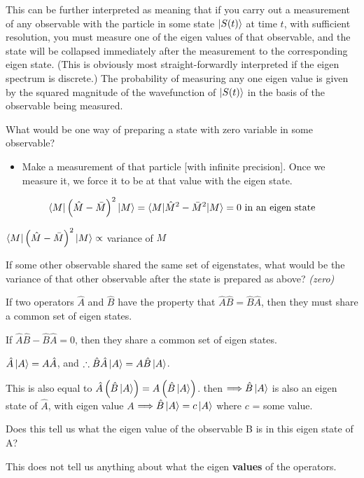 \documentclass{article}
\begin{document}
This can be further interpreted as meaning that if you carry out a measurement of any observable with the particle in some state $\ket{S(t)}$ at time $t$, with sufficient resolution, you must measure one of the eigen values of that observable, and the state will be collapsed immediately after the measurement to the corresponding eigen state.  (This is obviously most straight-forwardly interpreted if the eigen spectrum is discrete.)  The probability of measuring any one eigen value is given by the squared magnitude of the wavefunction of $\ket{S(t)}$ in the basis of the observable being measured.

What would be one way of preparing a state with zero variable in some observable?

\begin{itemize}
    \item Make a measurement of that particle [with infinite precision]. Once we measure it, we force it to be at that value with the eigen state. 
\end{itemize}

$$\braket{M|\left( \hat{M} - \bar{M} \right)^2|M} = \braket{M| \hat{M}^2 - \bar{M}^2 | M} = 0 \text{ in an eigen state}$$

$\braket{M|\left( \hat{M} -\bar{M} \right)^2|M} \propto $ variance of $M$

If some other observable shared the same set of eigenstates, what would be the variance of that other observable after the state is prepared as above? \textit{(zero)}

If two operators $\hat{A}$ and $\hat{B}$ have the property that $\hat{A} \hat{B} = \hat{B} \hat{A}$, then they must share a common set of eigen states. 

If $\hat{A} \hat{B} - \hat{B} \hat{A} = 0$, then they share a common set of eigen states. 

$\hat{A} \ket{A} = A \hat{A}$, and $\therefore \hat{B} \hat{A} \ket{A} = A \hat{B} \ket{A}$. 

This is also equal to $\hat{A} \left( \hat{B} \ket{A} \right) = A \left( \hat{B} \ket{A} \right)$. then $\Longrightarrow \hat{B} \ket{A}$ is also an eigen state of $\hat{A}$, with eigen value $A$ $\Longrightarrow \hat{B} \ket{A} = c \ket{A}$ where $c$ = some value.

Does this tell us what the eigen value of the observable B is in this eigen state of A?

This does not tell us anything about what the eigen \textbf{values} of the operators. 
\end{document}
